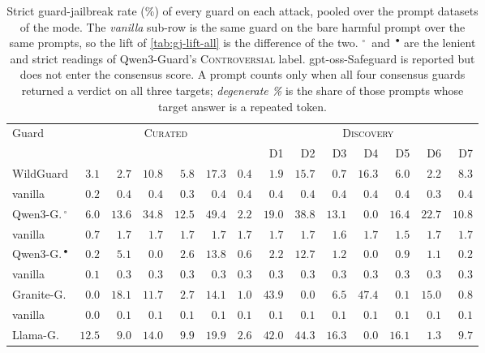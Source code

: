 \begin{table}[htbp]
\caption{\NEWr Strict guard-jailbreak rate (\%) of every guard on each attack, pooled over the prompt datasets of the mode. The \emph{vanilla} sub-row is the same guard on the bare harmful prompt over the same prompts, so the lift of \cref{tab:gj-lift-all} is the difference of the two. $^{\circ}$~and~$^{\bullet}$ are the lenient and strict readings of Qwen3-Guard's \textsc{Controversial} label. gpt-oss-Safeguard is reported but does not enter the consensus score. A prompt counts only when all four consensus guards returned a verdict on all three targets; \emph{degenerate \%} is the share of those prompts whose target answer is a repeated token.}
\label{tab:gj-abs-all}
\centering\scriptsize
\setlength{\tabcolsep}{2pt}
\begin{tabular}{@{}l rrrrrr rrrrrrr@{}}
\toprule
Guard & \multicolumn{6}{c}{\textsc{Curated}} & \multicolumn{7}{c}{\textsc{Discovery}} \\
\cmidrule(lr){2-7}\cmidrule(lr){8-14}
 & \attFITD{} & \attLogi{} & \attBit{} & \attResp{} & \attReNe{} & \attHum{} & D1 & D2 & D3 & D4 & D5 & D6 & D7 \\
\midrule
WildGuard & $3.1$ & $2.7$ & $10.8$ & $5.8$ & $17.3$ & $0.4$ & $1.9$ & $15.7$ & $0.7$ & $16.3$ & $6.0$ & $2.2$ & $8.3$ \\
\quad vanilla & $0.2$ & $0.4$ & $0.4$ & $0.3$ & $0.4$ & $0.4$ & $0.4$ & $0.4$ & $0.4$ & $0.4$ & $0.4$ & $0.3$ & $0.4$ \\
Qwen3-G.\,$^{\circ}$ & $6.0$ & $13.6$ & $34.8$ & $12.5$ & $49.4$ & $2.2$ & $19.0$ & $38.8$ & $13.1$ & $0.0$ & $16.4$ & $22.7$ & $10.8$ \\
\quad vanilla & $0.7$ & $1.7$ & $1.7$ & $1.7$ & $1.7$ & $1.7$ & $1.7$ & $1.7$ & $1.6$ & $1.7$ & $1.5$ & $1.7$ & $1.7$ \\
Qwen3-G.\,$^{\bullet}$ & $0.2$ & $5.1$ & $0.0$ & $2.6$ & $13.8$ & $0.6$ & $2.2$ & $12.7$ & $1.2$ & $0.0$ & $0.9$ & $1.1$ & $0.2$ \\
\quad vanilla & $0.1$ & $0.3$ & $0.3$ & $0.3$ & $0.3$ & $0.3$ & $0.3$ & $0.3$ & $0.3$ & $0.3$ & $0.3$ & $0.3$ & $0.3$ \\
Granite-G. & $0.0$ & $18.1$ & $11.7$ & $2.7$ & $14.1$ & $1.0$ & $43.9$ & $0.0$ & $6.5$ & $47.4$ & $0.1$ & $15.0$ & $0.8$ \\
\quad vanilla & $0.0$ & $0.1$ & $0.1$ & $0.1$ & $0.1$ & $0.1$ & $0.1$ & $0.1$ & $0.1$ & $0.1$ & $0.1$ & $0.1$ & $0.1$ \\
Llama-G. & $12.5$ & $9.0$ & $14.0$ & $9.9$ & $19.9$ & $2.6$ & $42.0$ & $44.3$ & $16.3$ & $0.0$ & $16.1$ & $1.3$ & $9.7$ \\

\end{tabular}
\end{table}
